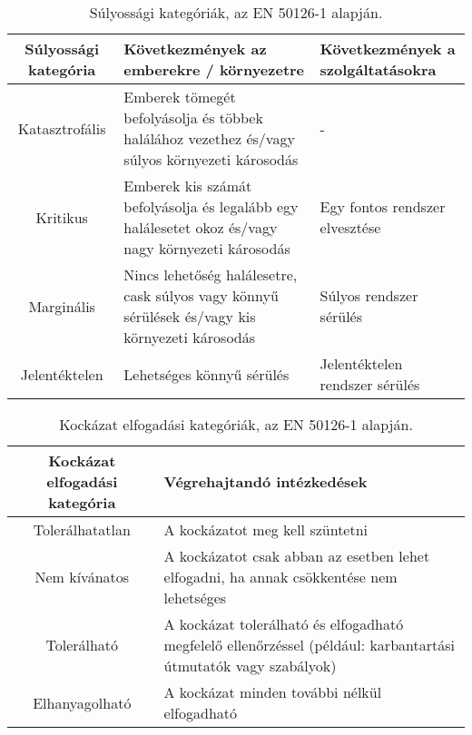 \begin{table}
    \footnotesize
    \centering
    \begin{tabular}{ |c|p{10em}|p{10em}| }
        \hline
        Súlyossági kategória & Következmények az emberekre / környezetre                                                                                                     & Következmények a szolgáltatásokra \\ \hline
        Katasztrofális       & Emberek tömegét befolyásolja és többek halálához vezethez és/vagy  súlyos környezeti károsodás      & -                                 \\ \hline
        Kritikus             & Emberek kis számát befolyásolja és legalább egy halálesetet okoz és/vagy  nagy környezeti károsodás & Egy fontos rendszer elvesztése    \\ \hline
        Marginális           & Nincs lehetőség halálesetre, cask súlyos vagy könnyű sérülések és/vagy kis környezeti károsodás     & Súlyos rendszer sérülés           \\ \hline
        Jelentéktelen        & Lehetséges könnyű sérülés                                                                                                                     & Jelentéktelen rendszer sérülés    \\ \hline
    \end{tabular}
    \caption{Súlyossági kategóriák, az EN 50126-1 alapján.}
    \label{tab:serverity}
\end{table}

\begin{table}
    \footnotesize
    \centering
    \begin{tabular}{ |c|p{20em}| }
        \hline
        Kockázat elfogadási kategória & Végrehajtandó intézkedések\\ \hline
        Tolerálhatatlan & A kockázatot meg kell szüntetni \\ \hline
        Nem kívánatos & A kockázatot csak abban az esetben lehet elfogadni, ha annak csökkentése nem lehetséges \\ \hline
        Tolerálható & A kockázat tolerálható és elfogadható megfelelő ellenőrzéssel (például: karbantartási útmutatók vagy szabályok) \\ \hline
        Elhanyagolható & A kockázat minden további nélkül elfogadható \\ \hline
    \end{tabular}
    \caption{Kockázat elfogadási kategóriák, az EN 50126-1 alapján.}
    \label{tab:risk}
\end{table}

